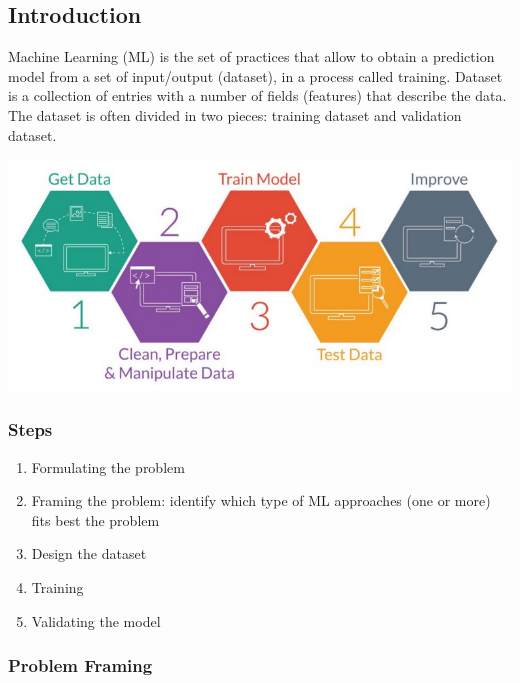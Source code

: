 \subsection{Introduction}
Machine Learning (ML) is the set of practices that allow to obtain a prediction model from a set of input/output (dataset), in a process called training. 
Dataset is a collection of entries with a number of fields (features) that describe the data.
The dataset is often divided in two pieces: training dataset and validation dataset.

\includegraphics[scale=0.3]{pictures/machine_learning_process.jpeg}

\subsubsection{Steps}
\begin{enumerate}
    \item Formulating the problem
    \item Framing the problem: identify which type of ML approaches (one or more) fits best the problem
    \item Design the dataset
    \item Training
    \item Validating the model
\end{enumerate}



\subsubsection{Problem Framing}

